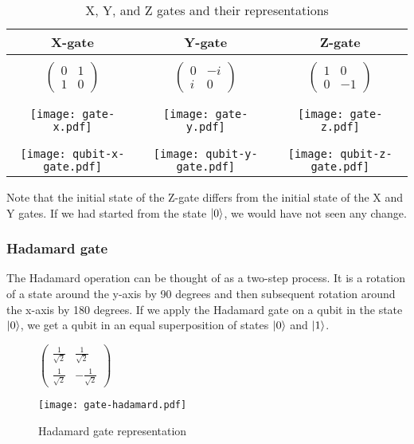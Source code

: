 \begin{table}[H]
  \centering
  \begin{tabular}{|c|c|c|} 
      \hline
      \textbf{X-gate} & \textbf{Y-gate} & \textbf{Z-gate}\\
      \hline
      &&\\[0.5pt]
      $\begin{pmatrix}
        0 & 1 \\
        1 & 0
      \end{pmatrix}$ & 
      $\begin{pmatrix}
        0 & -i \\
        i & 0
      \end{pmatrix}$ &
      $\begin{pmatrix}
        1 & 0 \\
        0 & -1
      \end{pmatrix}$\\
      &&\\[0.5pt]
      \hline
      &&\\[0.5pt]
      \texttt{[image: gate-x.pdf]} & \texttt{[image: gate-y.pdf]}  & \texttt{[image: gate-z.pdf]}\\
      &&\\[0.5pt]
      \hline
      &&\\[0.5pt]
      \texttt{[image: qubit-x-gate.pdf]} & \texttt{[image: qubit-y-gate.pdf]} & \texttt{[image: qubit-z-gate.pdf]}\\
      \hline
  \end{tabular}
  \caption{X, Y, and Z gates and their representations}
  \label{tab:xyz-gates}
\end{table}
Note that the initial state of the Z-gate differs from the initial state of the X and Y gates. If we had started from the state $\lvert0\rangle$, we would have not seen any change.

\subsubsection{Hadamard gate}
The Hadamard operation can be thought of as a two-step process. It is a rotation of a state around the y-axis by 90 degrees and then subsequent rotation around the x-axis by 180 degrees. If we apply the Hadamard gate on a qubit in the state $\lvert0\rangle$, we get a qubit in an equal superposition of states $\lvert0\rangle$ and $\lvert1\rangle$.
\begin{figure}[H]
    \centering
    \begin{minipage}{0.4\linewidth}
      \centering
      $\begin{pmatrix} 
        \frac{1}{\sqrt{2}} &  \frac{1}{\sqrt{2}}  \\
        \frac{1}{\sqrt{2}}  &  -\frac{1}{\sqrt{2}} 
        \end{pmatrix}$
    \end{minipage}
    \begin{minipage}{0.25\linewidth}
      \centering
      \texttt{[image: gate-hadamard.pdf]}
    \end{minipage}
    \caption{Hadamard gate representation}
\end{figure}

